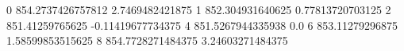 0 854.2737426757812 2.7469482421875
1 852.304931640625 0.77813720703125
2 851.41259765625 -0.11419677734375
4 851.5267944335938 0.0
6 853.11279296875 1.58599853515625
8 854.7728271484375 3.24603271484375
